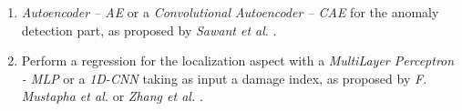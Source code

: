 \documentclass[12pt]{article}
\newcommand{\logosfolder}{logos/}
\begin{document}
\begin{enumerate}[itemsep=8pt]
    
    \item \textit{Autoencoder -- AE} or a \textit{Convolutional Autoencoder -- CAE} for the anomaly detection part, as proposed by \textit{Sawant et al}. \cite{SAWANT2023106931}. 
 
    \item Perform a regression for the localization aspect with a \textit{MultiLayer Perceptron - MLP} or a \textit{1D-CNN} taking as input a damage index, as proposed by \textit{F. Mustapha et al.} \cite{MUSTAPHA20071885} or \textit{Zhang et al.} \cite{ZHANG2021107107}.
    
\end{enumerate}

\newpage
\nocite{*}
\printbibliography[title={Bibliographic References}]
 
 
\newpage
\thispagestyle{empty}
 
\appendix
{}
 
    
\end{document}
